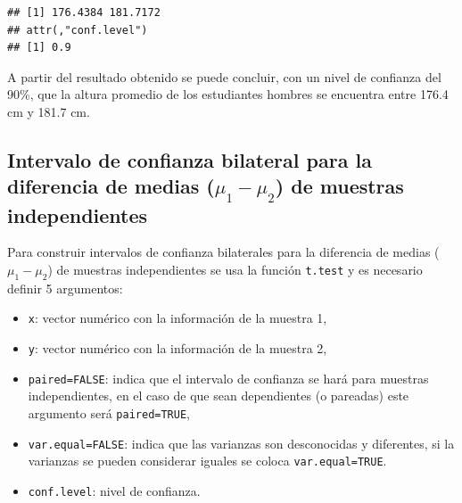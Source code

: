 \documentclass[
]{book}
\makeatletter
\newenvironment{Shaded}{\begin{snugshade}}{\end{snugshade}}
\newcommand{\AttributeTok}[1]{\textcolor[rgb]{0.77,0.63,0.00}{#1}}
\newcommand{\FloatTok}[1]{\textcolor[rgb]{0.00,0.00,0.81}{#1}}
\newcommand{\FunctionTok}[1]{\textcolor[rgb]{0.00,0.00,0.00}{#1}}
\newcommand{\NormalTok}[1]{#1}
\newcommand{\SpecialCharTok}[1]{\textcolor[rgb]{0.00,0.00,0.00}{#1}}
\providecommand{\tightlist}{%
  \setlength{\itemsep}{0pt}\setlength{\parskip}{0pt}}
\newenvironment{kframe}{%
\medskip{}
\setlength{\fboxsep}{.8em}
 \def\at@end@of@kframe{}%
 \ifinner\ifhmode%
  \def\at@end@of@kframe{\end{minipage}}%
  \begin{minipage}{\columnwidth}%
 \fi\fi%
 \def\FrameCommand##1{\hskip\@totalleftmargin \hskip-\fboxsep
 \colorbox{shadecolor}{##1}\hskip-\fboxsep
     \hskip-\linewidth \hskip-\@totalleftmargin \hskip\columnwidth}%
 \MakeFramed {\advance\hsize-\width
   \@totalleftmargin\z@ \linewidth\hsize
   \@setminipage}}%
 {\par\unskip\endMakeFramed%
 \at@end@of@kframe}
\renewenvironment{Shaded}{\begin{kframe}}{\end{kframe}}
\makeatother
\begin{document}
\begin{Shaded}
\end{Shaded}

\begin{verbatim}
## [1] 176.4384 181.7172
## attr(,"conf.level")
## [1] 0.9
\end{verbatim}

A partir del resultado obtenido se puede concluir, con un nivel de confianza del 90\%, que la altura promedio de los estudiantes hombres se encuentra entre 176.4 cm y 181.7 cm.

\hypertarget{intervalo-de-confianza-bilateral-para-la-diferencia-de-medias-mu_1-mu_2-de-muestras-independientes}{%
\subsection{\texorpdfstring{Intervalo de confianza bilateral para la diferencia de medias (\(\mu_1-\mu_2\)) de muestras independientes}{Intervalo de confianza bilateral para la diferencia de medias (\textbackslash mu\_1-\textbackslash mu\_2) de muestras independientes}}\label{intervalo-de-confianza-bilateral-para-la-diferencia-de-medias-mu_1-mu_2-de-muestras-independientes}}

Para construir intervalos de confianza bilaterales para la diferencia de medias (\(\mu_1-\mu_2\)) de muestras independientes se usa la función \texttt{t.test} y es necesario definir 5 argumentos:

\begin{itemize}
\tightlist
\item
  \texttt{x}: vector numérico con la información de la muestra 1,
\item
  \texttt{y}: vector numérico con la información de la muestra 2,
\item
  \texttt{paired=FALSE}: indica que el intervalo de confianza se hará para muestras independientes, en el caso de que sean dependientes (o pareadas) este argumento será \texttt{paired=TRUE},
\item
  \texttt{var.equal=FALSE}: indica que las varianzas son desconocidas y diferentes, si la varianzas se pueden considerar iguales se coloca \texttt{var.equal=TRUE}.
\item
  \texttt{conf.level}: nivel de confianza.
\end{itemize}
\end{document}

